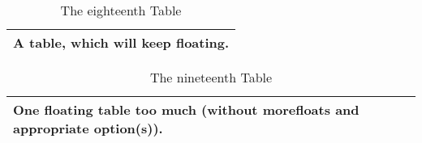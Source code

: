 \documentclass[british]{article}
\begin{document}
\begin{table}[t] \centering%
\begin{tabular}{|l|}
\hline
A table, which will keep floating.\\ \hline
\end{tabular}%
\caption{The eighteenth Table}%
\end{table}%

\begin{table}[t] \centering%
\begin{tabular}{|l|}
\hline
One floating table too much
(without \textsf{morefloats} and appropriate option(s)).\\ \hline
\end{tabular}%
\caption{The nineteenth Table}%
\end{table}%
\end{document}
